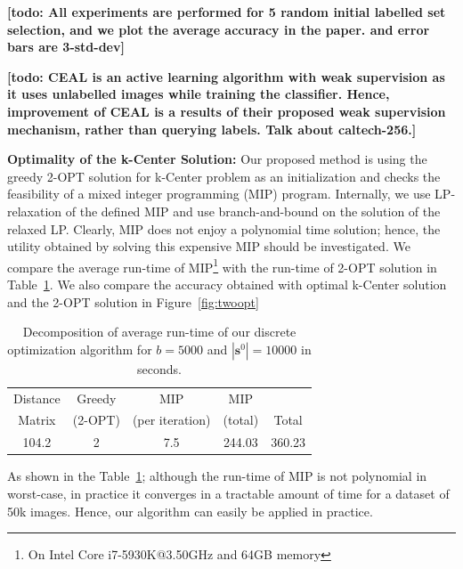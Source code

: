 \documentclass{article}
\newcommand{\todo}[1]{{\bf \color{red}[todo: #1]}}
\begin{document}
\todo{All experiments are performed for 5 random initial labelled set selection, and we plot the average accuracy in the paper.  and error bars are 3-std-dev}

\todo{ CEAL is an active learning algorithm with weak supervision as it uses unlabelled images while training the classifier. Hence, improvement of CEAL is a results of their proposed weak supervision mechanism, rather than querying labels. Talk about caltech-256.}

\noindent\textbf{Optimality of the k-Center Solution:} Our proposed method is using the greedy 2-OPT solution for k-Center problem as an initialization and checks the feasibility of a mixed integer programming (MIP) program. Internally, we use LP-relaxation of the defined MIP and use branch-and-bound on the solution of the relaxed LP. Clearly, MIP does not enjoy a polynomial time solution; hence, the utility obtained by solving this expensive MIP should be investigated. We compare the average run-time of MIP\footnote{On Intel Core i7-5930K@3.50GHz and 64GB memory} with the run-time of 2-OPT solution in Table~\ref{tab:runtime}. We also compare the accuracy obtained with optimal k-Center solution and the 2-OPT solution in Figure~\ref{fig:twoopt}



\begin{table}[ht]
\centering
\vspace{-3mm}
\caption{Decomposition of average run-time of our discrete optimization algorithm for $b=5000$ and $|\mathbf{s}^0|=10000$ in seconds.}
\begin{tabular}{ccccc} \toprule
 Distance& Greedy & MIP & MIP &  \\
Matrix &(2-OPT) & (per iteration) & (total) & Total \\ \midrule
104.2  & 2   & 7.5  &  244.03  & 360.23  \\ \bottomrule
\end{tabular}
\label{tab:runtime}
\vspace{-2mm}
\end{table}

As shown in the Table~\ref{tab:runtime}; although the run-time of MIP is not polynomial in worst-case, in practice it converges in a tractable amount of time for a dataset of 50k images. %
Hence, our algorithm can easily be applied in practice. %
 
\end{document}

